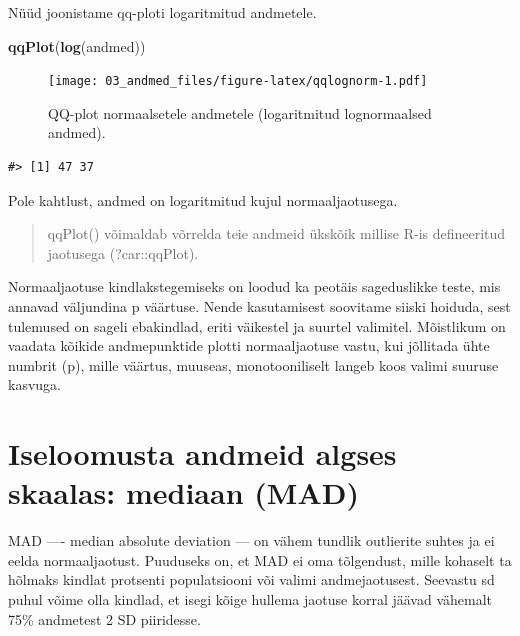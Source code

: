 \documentclass[]{book}
\newenvironment{Shaded}{\begin{snugshade}}{\end{snugshade}}
\newcommand{\KeywordTok}[1]{\textcolor[rgb]{0.13,0.29,0.53}{\textbf{#1}}}
\newcommand{\NormalTok}[1]{#1}
\begin{document}
Nüüd joonistame qq-ploti logaritmitud andmetele.



\begin{Shaded}
\begin{Highlighting}[]
\KeywordTok{qqPlot}\NormalTok{(}\KeywordTok{log}\NormalTok{(andmed))}
\end{Highlighting}
\end{Shaded}

\begin{figure}
\centering
\texttt{[image: 03\_andmed\_files/figure-latex/qqlognorm-1.pdf]}
\caption{\label{fig:qqlognorm}QQ-plot normaalsetele andmetele (logaritmitud lognormaalsed andmed).}
\end{figure}

\begin{verbatim}
#> [1] 47 37
\end{verbatim}

Pole kahtlust, andmed on logaritmitud kujul normaaljaotusega.

\begin{quote}
qqPlot() võimaldab võrrelda teie andmeid ükskõik millise R-is defineeritud jaotusega (?car::qqPlot).
\end{quote}

Normaaljaotuse kindlakstegemiseks on loodud ka peotäis sageduslikke teste, mis annavad väljundina p väärtuse. Nende kasutamisest soovitame siiski hoiduda, sest tulemused on sageli ebakindlad, eriti väikestel ja suurtel valimitel. Mõistlikum on vaadata kõikide andmepunktide plotti normaaljaotuse vastu, kui jõllitada ühte numbrit (p), mille väärtus, muuseas, monotooniliselt langeb koos valimi suuruse kasvuga.

\hypertarget{iseloomusta-andmeid-algses-skaalas-mediaan-mad}{%
\section*{Iseloomusta andmeid algses skaalas: mediaan (MAD)}\label{iseloomusta-andmeid-algses-skaalas-mediaan-mad}}

MAD ---- median absolute deviation --- on vähem tundlik outlierite suhtes ja ei eelda normaaljaotust. Puuduseks on, et MAD ei oma tõlgendust, mille kohaselt ta hõlmaks kindlat protsenti populatsiooni või valimi andmejaotusest. Seevastu sd puhul võime olla kindlad, et isegi kõige hullema jaotuse korral jäävad vähemalt 75\% andmetest 2 SD piiridesse.
\end{document}
